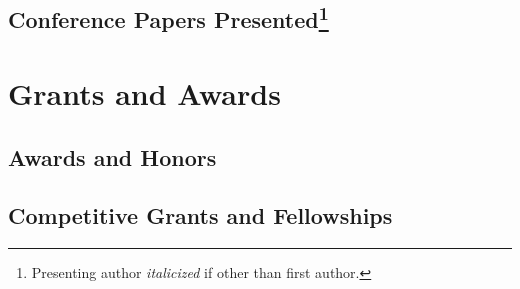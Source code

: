 \documentclass[11pt,letterpaper]{report}
\begin{document}
    \subsection*{Conference Papers Presented\footnote{Presenting author \textit{italicized} if other than first author.}}

    \begin{tablist}



    \end{tablist}



    \section*{Grants and Awards}

    \subsection*{Awards and Honors}

    \begin{tablist}


    \end{tablist}

    \subsection*{Competitive Grants and Fellowships}
\end{document}
